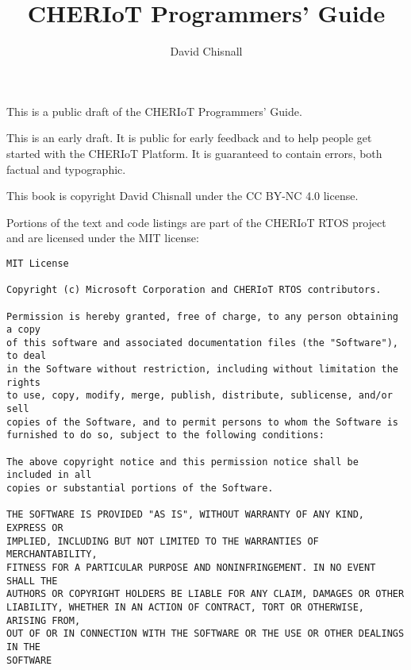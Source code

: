 \title{CHERIoT Programmers' Guide}
\author{David Chisnall}

\if[output=sile]{\eject{}\par{}}

This is a public draft of the CHERIoT Programmers' Guide.

\begin{warning}
This is an early draft.
It is public for early feedback and to help people get started with the CHERIoT Platform.
It is guaranteed to contain errors, both factual and typographic.
\end{warning}

This book is copyright David Chisnall under the CC BY-NC 4.0 license.

Portions of the text and code listings are part of the CHERIoT RTOS project and are licensed under the MIT license:

\begin{verbatim}
MIT License

Copyright (c) Microsoft Corporation and CHERIoT RTOS contributors.

Permission is hereby granted, free of charge, to any person obtaining a copy
of this software and associated documentation files (the "Software"), to deal
in the Software without restriction, including without limitation the rights
to use, copy, modify, merge, publish, distribute, sublicense, and/or sell
copies of the Software, and to permit persons to whom the Software is
furnished to do so, subject to the following conditions:

The above copyright notice and this permission notice shall be included in all
copies or substantial portions of the Software.

THE SOFTWARE IS PROVIDED "AS IS", WITHOUT WARRANTY OF ANY KIND, EXPRESS OR
IMPLIED, INCLUDING BUT NOT LIMITED TO THE WARRANTIES OF MERCHANTABILITY,
FITNESS FOR A PARTICULAR PURPOSE AND NONINFRINGEMENT. IN NO EVENT SHALL THE
AUTHORS OR COPYRIGHT HOLDERS BE LIABLE FOR ANY CLAIM, DAMAGES OR OTHER
LIABILITY, WHETHER IN AN ACTION OF CONTRACT, TORT OR OTHERWISE, ARISING FROM,
OUT OF OR IN CONNECTION WITH THE SOFTWARE OR THE USE OR OTHER DEALINGS IN THE
SOFTWARE
\end{verbatim}


















